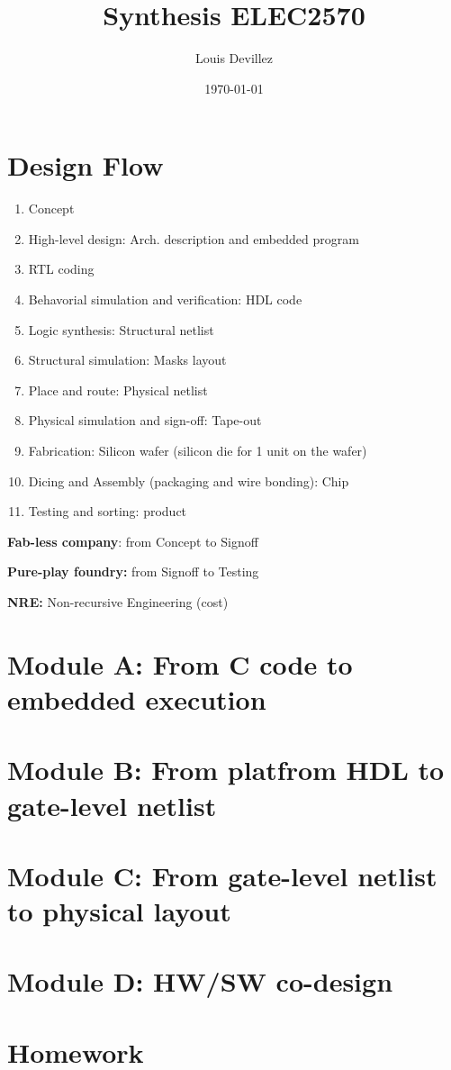 


\title{Synthesis ELEC2570}
\author{Louis Devillez}
\date{\today}



\maketitle

\tableofcontents
\section{Design Flow}
\begin{enumerate}
  \item Concept
  \item High-level design: Arch. description and embedded program
  \item RTL coding
  \item Behavorial simulation and verification: HDL code
  \item Logic synthesis: Structural netlist
  \item Structural simulation: Masks layout
  \item Place and route: Physical netlist
  \item Physical simulation and sign-off: Tape-out
  \item Fabrication: Silicon wafer (silicon die for 1 unit on the wafer)
  \item Dicing and Assembly (packaging and wire bonding): Chip
  \item Testing and sorting: product
\end{enumerate}

\textbf{Fab-less company}: from Concept to Signoff

\textbf{Pure-play foundry:} from Signoff to Testing

\textbf{NRE:} Non-recursive Engineering (cost)
      
\section{Module A: From C code to embedded execution}

\section{Module B: From platfrom HDL to gate-level netlist}


\section{Module C: From gate-level netlist to physical layout}

\section{Module D: HW/SW co-design}


\section{Homework}




